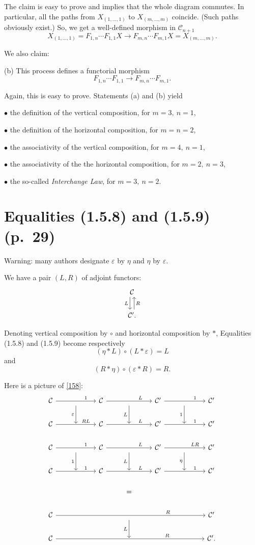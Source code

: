\documentclass[12pt]{article}
\theoremstyle{remark}%
\newcommand{\bu}{\bullet}
\newcommand{\n}{\noindent}
\newcommand{\C}{\mathcal C}
\newcommand{\e}{\varepsilon}
\newcommand{\be}{\begin{equation}}
\newcommand{\ee}{\end{equation}}
\begin{document}
The claim is easy to prove and implies that the whole diagram commutes. In particular, all the paths from $X_{(1,\dots,1)}$ to $X_{(m,\dots,m)}$ coincide. (Such paths obviously exist.) So, we get a well-defined morphism in $\C_{n+1}$
$$
X_{(1,\dots,1)}=F_{1,n}\cdots F_{1,1}X\to F_{m,n}\cdots F_{m,1}X=X_{(m,\dots,m)}.
$$

We also claim: 

\n(b) This process defines a functorial morphism 
$$
F_{1,n}\cdots F_{1,1}\to F_{m,n}\cdots F_{m,1}.
$$

Again, this is easy to prove. Statements (a) and (b) yield 

\n$\bu$ the definition of the vertical composition, for $m=3,\ n=1$,

\n$\bu$ the definition of the horizontal composition, for $m=n=2$,

\n$\bu$ the associativity of the vertical composition, for $m=4,\ n=1$,

\n$\bu$ the associativity of the the horizontal composition, for $m=2,\ n=3$,

\n$\bu$ the so-called \emph{Interchange Law}, for $m=3,\ n=2$.
%
\section{Equalities (1.5.8) and (1.5.9) (p.~29)} %
%
Warning: many authors designate $\e$ by $\eta$ and $\eta$ by $\e$. 

We have a pair $(L,R)$ of adjoint functors: 
$$
\begin{tikzcd}
\C\ar[xshift=-.7ex]{d}[swap]{L}\\ 
\C'.\ar[xshift=.7ex]{u}[swap]{R}
\end{tikzcd}
$$

Denoting vertical composition by $\circ$ and horizontal composition by $*$, Equalities (1.5.8) and (1.5.9) become respectively 
%
\be\label{158} 
(\eta*L)\circ(L*\e)=L
\ee 
% 
and 
%
\be\label{159} 
(R*\eta)\circ(\e*R)=R.
\ee 
% 

Here is a picture of \eqref{158}: 
$$
\begin{tikzcd}
%
\C\ar{rr}{}[near end]{1}&\ar{d}[swap]{\e}&\C\ar{rr}{}[near end]{L}&\ar{d}[swap]{L}&\C'\ar{rr}{}[near end]{1}&\ar{d}[swap]{1}&\C'\\ 
%
\C\ar{rr}{}[near end]{RL}&{}&\C\ar{rr}{}[near end]{L}&{}&\C'\ar{rr}{}[near end]{1}&{}&\C'\\ 
%
\C\ar{rr}{}[near end]{1}&\ar{d}[swap]{1}&\C\ar{rr}{}[near end]{L}&\ar{d}[swap]{L}&\C'\ar{rr}{}[near end]{LR}&\ar{d}[swap]{\eta}&\C'\\ 
%
\C\ar{rr}{}[near end]{1}&{}&\C\ar{rr}{}[near end]{L}&{}&\C'\ar{rr}{}[near end]{1}&{}&\C'\\ 
%
&&&=\\ 
%
\C\ar{rrrrrr}[near end]{R}&&&{}\ar{d}[swap]{L}&&&\C'\\
%
\C\ar{rrrrrr}[near end]{R}&&&{}&&&\C'.
%
\end{tikzcd}
$$ 
\end{document}
